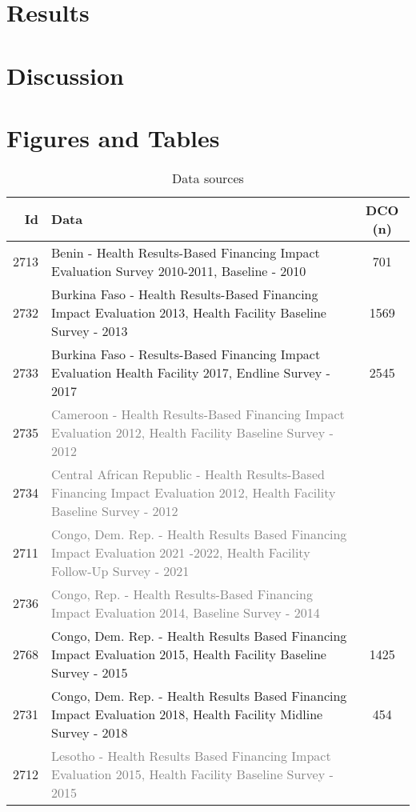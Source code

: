 \documentclass{article}
\begin{document}
\section{Results}
\section{Discussion}
\section*{Figures and Tables}
\begin{table}[ht]
\centering
\begin{tabular}{@{}r >{\raggedright\arraybackslash}p{10cm} c@{}}
\toprule
\textbf{Id} & \textbf{Data} & \textbf{DCO (n)} \\
\midrule
2713 & Benin - Health Results-Based Financing Impact Evaluation Survey 2010-2011, Baseline - 2010 & 701\\
2732 & Burkina Faso - Health Results-Based Financing Impact Evaluation 2013, Health Facility Baseline Survey - 2013 & 1569\\
2733 & Burkina Faso - Results-Based Financing Impact Evaluation Health Facility 2017, Endline Survey - 2017 & 2545\\
2735 & \textcolor{gray}{Cameroon - Health Results-Based Financing Impact Evaluation 2012, Health Facility Baseline Survey - 2012} & \\
2734 & \textcolor{gray}{Central African Republic - Health Results-Based Financing Impact Evaluation 2012, Health Facility Baseline Survey - 2012} & \\
2711 & \textcolor{gray}{Congo, Dem. Rep. - Health Results Based Financing Impact Evaluation 2021 -2022, Health Facility Follow-Up Survey - 2021} & \\
2736 & \textcolor{gray}{Congo, Rep. - Health Results-Based Financing Impact Evaluation 2014, Baseline Survey - 2014} & \\
2768 & Congo, Dem. Rep. - Health Results Based Financing Impact Evaluation 2015, Health Facility Baseline Survey - 2015 & 1425 \\
2731 & Congo, Dem. Rep. - Health Results Based Financing Impact Evaluation 2018, Health Facility Midline Survey - 2018 & 454\\
2712 & \textcolor{gray}{Lesotho - Health Results Based Financing Impact Evaluation 2015, Health Facility Baseline Survey - 2015} & \\
\bottomrule
\end{tabular}
\caption{Data sources}
\label{tab:data sources}
\end{table}
\end{document}
